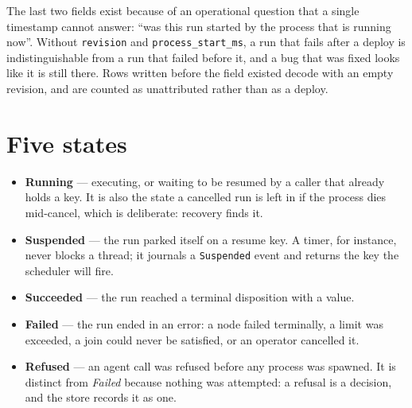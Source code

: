 The last two fields exist because of an operational question that a single timestamp cannot answer:
\enquote{was this run started by the process that is running now}. Without \texttt{revision} and
\texttt{process\_start\_ms}, a run that fails after a deploy is indistinguishable from a run that
failed before it, and a bug that was fixed looks like it is still there. Rows written before the
field existed decode with an empty revision, and are counted as unattributed rather than as a
deploy.

\section{Five states}

\begin{center}
\end{center}

\begin{itemize}
	\item \textbf{Running} --- executing, or waiting to be resumed by a caller that already holds a
	key. It is also the state a cancelled run is left in if the process dies mid-cancel, which is
	deliberate: recovery finds it.
	\item \textbf{Suspended} --- the run parked itself on a resume key. A timer, for instance,
	never blocks a thread; it journals a \texttt{Suspended} event and returns the key the scheduler
	will fire.
	\item \textbf{Succeeded} --- the run reached a terminal disposition with a value.
	\item \textbf{Failed} --- the run ended in an error: a node failed terminally, a limit was
	exceeded, a join could never be satisfied, or an operator cancelled it.
	\item \textbf{Refused} --- an agent call was refused before any process was spawned. It is
	distinct from \emph{Failed} because nothing was attempted: a refusal is a decision, and the
	store records it as one.
\end{itemize}

